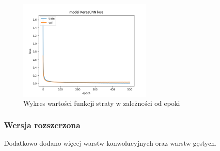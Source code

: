 \documentclass{article}
\begin{document}
\begin{figure}[H]
    \centering
    \includegraphics[width=0.6\textwidth]{../Saves/KerasCNN/mnist-784/KerasCNN_mnist_784_ep500_loss.png}
    \caption{Wykres wartości funkcji straty w zależności od epoki}
\end{figure}

\subsubsection{Wersja rozszerzona}

Dodatkowo dodano więcej warstw konwolucyjnych oraz warstw gęstych.
\end{document}
